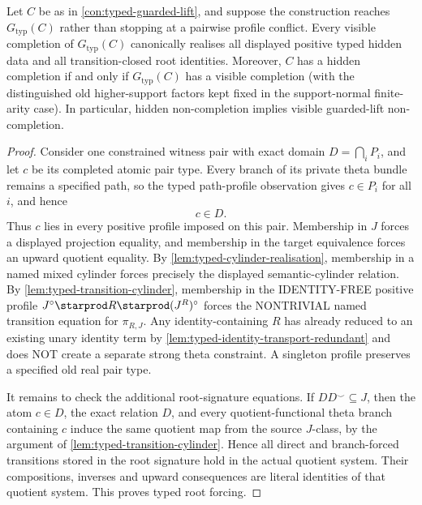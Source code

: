 \begin{lemma}
\label{lem:typed-guarded-lift-equivalence}
Let \(C\) be as in \cref{con:typed-guarded-lift}, and suppose the
construction reaches \(G_{\mathrm{typ}}(C)\) rather than stopping at a
pairwise profile conflict.  Every visible completion of
\(G_{\mathrm{typ}}(C)\) canonically realises all displayed positive typed
hidden data and all transition-closed root identities.  Moreover,
\(C\) has a hidden completion if and only if
\(G_{\mathrm{typ}}(C)\) has a visible completion (with the distinguished
old higher-support factors kept fixed in the support-normal finite-arity
case).  In particular, hidden non-completion implies visible guarded-lift
non-completion.
\end{lemma}

\begin{proof}
Consider one constrained witness pair with exact domain
\(D=\bigcap_iP_i\), and let \(c\) be its completed atomic pair type.  Every
branch of its private theta bundle remains a specified path, so the typed
path-profile observation gives \(c\in P_i\) for all \(i\), and hence
\[
 c\in D. \tag{TGR}\label{eq:typed-guarded-root-colour}
\]
Thus \(c\) lies in every positive profile imposed on this pair.  Membership
in \(J\) forces a displayed projection equality, and membership in the target
equivalence forces an upward quotient equality.  By
\cref{lem:typed-cylinder-realisation}, membership in a named mixed cylinder
forces precisely the displayed semantic-cylinder relation.
By \cref{lem:typed-transition-cylinder}, membership in the
IDENTITY-FREE positive profile
\(J^\circ\starprod R\starprod(J^R)^\circ\)
forces the NONTRIVIAL named transition
equation for \(\pi_{R,J}\).
Any identity-containing \(R\)
has already reduced to an existing
unary identity term by
\cref{lem:typed-identity-transport-redundant}
and does NOT create a separate
strong theta constraint.
A singleton profile preserves a specified old real pair
type.

It remains to check the additional root-signature equations.  If
\(DD^{\smile}\subseteq J\), then the atom \(c\in D\), the exact
relation \(D\), and every quotient-functional theta branch containing
\(c\) induce the same quotient map from the source \(J\)-class, by the
argument of \cref{lem:typed-transition-cylinder}.  Hence all direct and
branch-forced transitions stored in the root signature hold in the actual
quotient system.  Their compositions, inverses and upward consequences are
literal identities of that quotient system.  This proves typed root forcing.


\end{proof}
